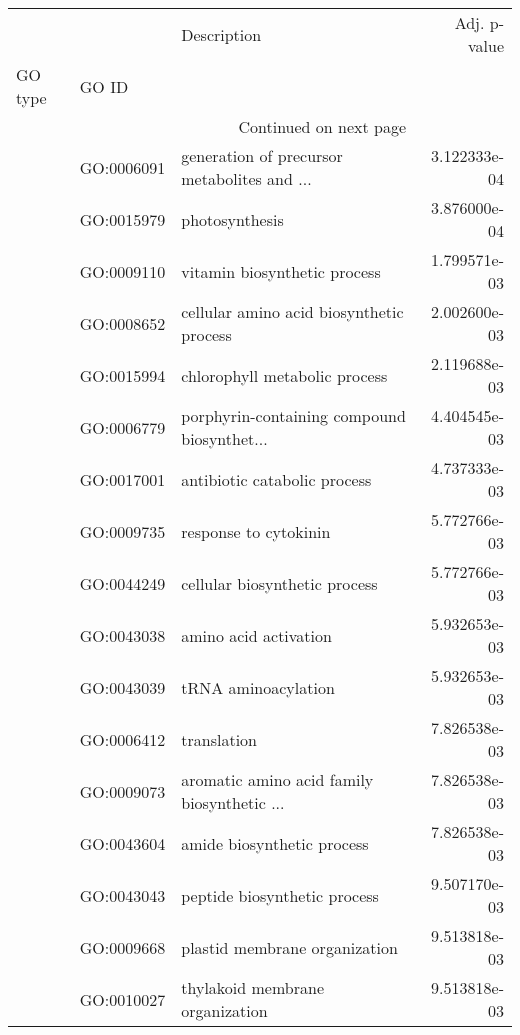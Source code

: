 \begin{longtable}{lllr}
\toprule
   &            &                                  Description &  Adj. p-value \\
GO type & GO ID &                                              &               \\
\midrule
\endhead
\midrule
\multicolumn{3}{r}{{Continued on next page}} \\
\midrule
\endfoot

\bottomrule
\endlastfoot
\multirow{47}{*}{BP} & GO:0006091 &  generation of precursor metabolites and ... &  3.122333e-04 \\
   & GO:0015979 &                               photosynthesis &  3.876000e-04 \\
   & GO:0009110 &                 vitamin biosynthetic process &  1.799571e-03 \\
   & GO:0008652 &     cellular amino acid biosynthetic process &  2.002600e-03 \\
   & GO:0015994 &                chlorophyll metabolic process &  2.119688e-03 \\
   & GO:0006779 &  porphyrin-containing compound biosynthet... &  4.404545e-03 \\
   & GO:0017001 &                 antibiotic catabolic process &  4.737333e-03 \\
   & GO:0009735 &                        response to cytokinin &  5.772766e-03 \\
   & GO:0044249 &                cellular biosynthetic process &  5.772766e-03 \\
   & GO:0043038 &                        amino acid activation &  5.932653e-03 \\
   & GO:0043039 &                          tRNA aminoacylation &  5.932653e-03 \\
   & GO:0006412 &                                  translation &  7.826538e-03 \\
   & GO:0009073 &  aromatic amino acid family biosynthetic ... &  7.826538e-03 \\
   & GO:0043604 &                   amide biosynthetic process &  7.826538e-03 \\
   & GO:0043043 &                 peptide biosynthetic process &  9.507170e-03 \\
   & GO:0009668 &                plastid membrane organization &  9.513818e-03 \\
   & GO:0010027 &              thylakoid membrane organization &  9.513818e-03 \\

\end{longtable}
